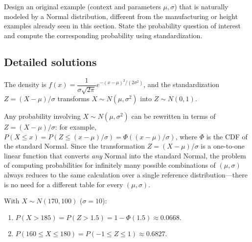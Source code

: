 \begin{problema}
	\label{prob:1c4fda2}
	Design an original example (context and parameters $\mu,\sigma$) that is naturally modeled by a Normal distribution, different from the manufacturing or height examples already seen in this section. State the probability question of interest and compute the corresponding probability using standardization.
\end{problema}

\subsection*{Detailed solutions}

\begin{solproblema}[prob:6f58870]
	The density is $f(x) = \dfrac{1}{\sigma\sqrt{2\pi}}e^{-(x-\mu)^2/(2\sigma^2)}$, and the standardization $Z=(X-\mu)/\sigma$ transforms $X\sim N(\mu,\sigma^2)$ into $Z\sim N(0,1)$.
\end{solproblema}

\begin{solproblema}[prob:74e7285]
	Any probability involving $X\sim N(\mu,\sigma^2)$ can be rewritten in terms of $Z=(X-\mu)/\sigma$: for example, $P(X\le x) = P(Z \le (x-\mu)/\sigma) = \Phi((x-\mu)/\sigma)$, where $\Phi$ is the CDF of the standard Normal. Since the transformation $Z=(X-\mu)/\sigma$ is a one-to-one linear function that converts \emph{any} Normal into the standard Normal, the problem of computing probabilities for infinitely many possible combinations of $(\mu,\sigma)$ always reduces to the same calculation over a single reference distribution---there is no need for a different table for every $(\mu,\sigma)$.
\end{solproblema}

\begin{solproblema}[prob:48f2103]
	With $X\sim N(170,100)$ ($\sigma=10$):
	\begin{enumerate}
		\item $P(X>185) = P(Z>1.5) = 1-\Phi(1.5) \approx 0.0668$.
		\item $P(160\le X\le180) = P(-1\le Z\le1) \approx 0.6827$.
	\end{enumerate}
\end{solproblema}


